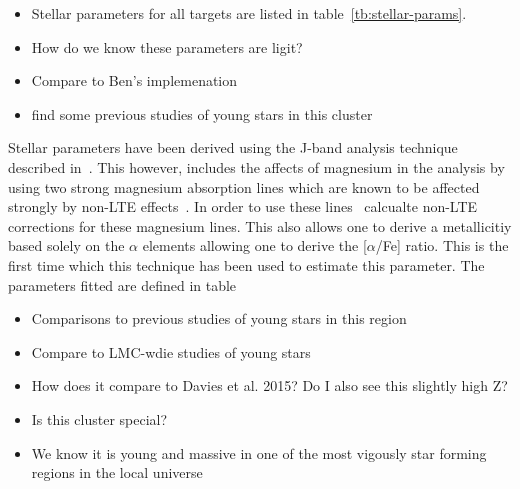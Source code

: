 \documentclass[useAMS,usenatbib]{mn2e}
\begin{document}
\begin{itemize}
  \item Stellar parameters for all targets are listed in table~\ref{tb:stellar-params}.
  \item How do we know these parameters are ligit?
  \item Compare to Ben's implemenation
  \item find some previous studies of young stars in this cluster
\end{itemize}

Stellar parameters have been derived using the J-band analysis technique described in~\cite{2010MNRAS.407.1203D}.
This however, includes the affects of magnesium in the analysis by using two strong magnesium absorption lines which are known to be affected strongly by non-LTE effects~\citep{2015ApJ...804..113B}.
In order to use these lines~\cite{2015ApJ...804..113B} calcualte non-LTE corrections for these magnesium lines.
This also allows one to derive a metallicitiy based solely on the $\alpha$ elements allowing one to derive the [$\alpha$/Fe] ratio.
This is the first time which this technique has been used to estimate this parameter.
The parameters fitted are defined in table

\begin{itemize}
  \item Comparisons to previous studies of young stars in this region
  \item Compare to LMC-wdie studies of young stars
  \item How does it compare to Davies et al. 2015? Do I also see this slightly high Z?
  \item Is this cluster special?
  \item We know it is young and massive in one of the most vigously star forming regions in the local universe
\end{itemize}
\end{document}
